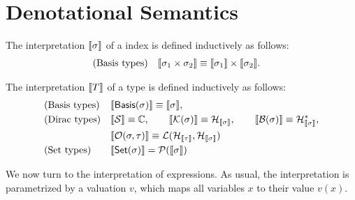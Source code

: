 \section{Denotational Semantics}
\label{sec: full denotational sem}

\begin{definition}
The interpretation ${\llbracket \sigma \rrbracket}$ of a index is defined inductively as follows:
    \begin{align*}
        & \textrm{(Basis types)} &&
        {\llbracket \sigma_1 \times \sigma_2 \rrbracket} \equiv {\llbracket \sigma_1 \rrbracket} \times {\llbracket \sigma_2 \rrbracket}.
     \end{align*}
\end{definition}

\begin{definition}
The interpretation ${\llbracket T \rrbracket}$ of a type is defined inductively as follows:
\begin{align*}
    & \text{(Basis types)} && \begin{aligned}
      & {\llbracket \mathsf{Basis}(\sigma) \rrbracket} \equiv {\llbracket \sigma \rrbracket},
 \end{aligned} \\
    & \text{(Dirac types)} &&
 {\llbracket \mathcal{S} \rrbracket} \equiv \mathbb{C},
 \qquad
 {\llbracket \mathcal{K}(\sigma) \rrbracket} \equiv \mathcal{H}_{{\llbracket \sigma \rrbracket}}, 
 \qquad
 {\llbracket \mathcal{B}(\sigma) \rrbracket} \equiv \mathcal{H}^*_{{\llbracket \sigma \rrbracket}},
      \\ & &&
 {\llbracket \mathcal{O}(\sigma, \tau) \rrbracket} \equiv \mathcal{L}(\mathcal{H}_{\llbracket \tau \rrbracket}, \mathcal{H}_{\llbracket \sigma \rrbracket})
    \\
    & \text{(Set types)} &&
    {\llbracket \mathsf{Set}(\sigma) \rrbracket} = \mathcal{P}({\llbracket \sigma \rrbracket})
\end{align*}
\end{definition}

We now turn to the interpretation of expressions. As usual, the interpretation is parametrized by a valuation \(v\), which maps all variables $x$ to their value $v(x)$. 


